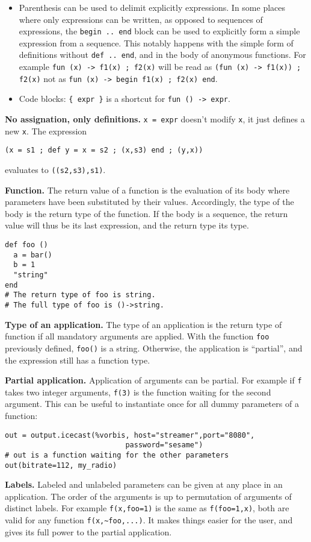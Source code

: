 \begin{itemize}
\item Parenthesis can be used to delimit explicitly expressions. In some places where only expressions can be written, as opposed to sequences of expressions, the \verb+begin .. end+ block can be used to explicitly form a simple expression from a sequence. This notably happens with the simple form of definitions without \verb+def .. end+, and in the body of anonymous functions. For example \verb+fun (x) -> f1(x) ; f2(x)+ will be read as \verb+(fun (x) -> f1(x)) ; f2(x)+ not as \verb+fun (x) -> begin f1(x) ; f2(x) end+.
\item Code blocks: \verb+{ expr }+ is a shortcut for \verb+fun () -> expr+.

\end{itemize}
\textbf{No assignation, only definitions.} \verb+x = expr+ doesn't modify \verb+x+, it just defines a new \verb+x+. The expression \begin{verbatim}
(x = s1 ; def y = x = s2 ; (x,s3) end ; (y,x))
\end{verbatim}
 evaluates to \verb+((s2,s3),s1)+.

\textbf{Function.} The return value of a function is the evaluation of its body where parameters have been substituted by their values. Accordingly, the type of the body is the return type of the function. If the body is a sequence, the return value will thus be its last expression, and the return type its type.

\begin{verbatim}
def foo ()
  a = bar()
  b = 1
  "string"
end
# The return type of foo is string.
# The full type of foo is ()->string.
\end{verbatim}
\textbf{Type of an application.} The type of an application is the return type of function if all mandatory arguments are applied. With the function \verb+foo+ previously defined, \verb+foo()+ is a string. Otherwise, the application is ``partial'', and the expression still has a function type.

\textbf{Partial application.} Application of arguments can be partial. For example if \verb+f+ takes two integer arguments, \verb+f(3)+ is the function waiting for the second argument. This can be useful to instantiate once for all dummy parameters of a function:

\begin{verbatim}
out = output.icecast(%vorbis, host="streamer",port="8080",
                            password="sesame")
# out is a function waiting for the other parameters
out(bitrate=112, my_radio)
\end{verbatim}
\textbf{Labels.} Labeled and unlabeled parameters can be given at any place in an application. The order of the arguments is up to permutation of arguments of distinct labels. For example \verb+f(x,foo=1)+ is the same as \verb+f(foo=1,x)+, both are valid for any function \verb+f(x,~foo,...)+. It makes things easier for the user, and gives its full power to the partial application.

